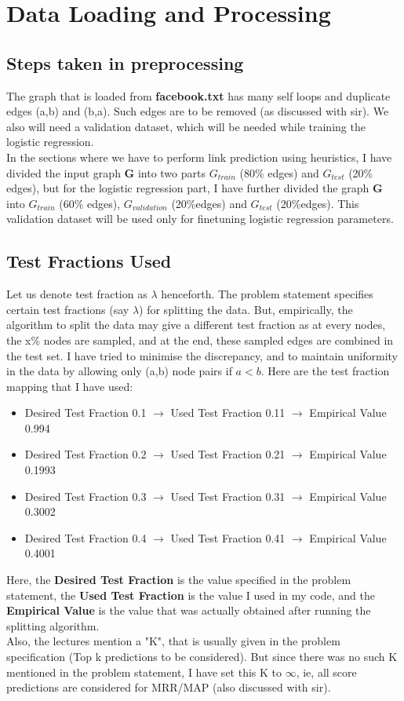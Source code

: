 \documentclass[12pt, a4paper]{article}
\begin{document}
\tableofcontents
\newpage

\section{Data Loading and Processing}
\subsection*{Steps taken in preprocessing}
\quad The graph that is loaded from \textbf{facebook.txt} has many self loops and duplicate edges (a,b) and (b,a). Such edges are to be removed (as discussed with sir). We also will need a validation dataset, which will be needed while training the logistic regression. \\
\null\quad In the sections where we have to perform link prediction using heuristics, I have divided the input graph \textbf{G} into two parts $G_{train}$ (80\% edges) and $G_{test}$ (20\% edges), but for the logistic regression part, I have further divided the graph \textbf{G} into $G_{train}$ (60\% edges), $G_{validation}$ (20\%edges) and $G_{test}$ (20\%edges). This validation dataset will be used only for finetuning logistic regression parameters.
\subsection*{Test Fractions Used}
Let us denote test fraction as $\lambda$ henceforth.
\quad The problem statement specifies certain test fractions (say $\lambda$) for splitting the data. But, empirically, the algorithm to split the data may give a different test fraction as at every nodes, the x\% nodes are sampled, and at the end,  these sampled edges are combined in the test set. I have tried to minimise the discrepancy, and to maintain uniformity in the data by allowing only (a,b) node pairs if $a < b$. Here are the test fraction mapping that I have used:
\begin{itemize}
\item Desired Test Fraction 0.1 $\rightarrow$ Used Test Fraction 0.11 $\rightarrow$ Empirical Value 0.994
\item Desired Test Fraction 0.2 $\rightarrow$ Used Test Fraction 0.21 $\rightarrow$ Empirical Value 0.1993
\item Desired Test Fraction 0.3 $\rightarrow$ Used Test Fraction 0.31 $\rightarrow$ Empirical Value 0.3002
\item Desired Test Fraction 0.4 $\rightarrow$ Used Test Fraction 0.41 $\rightarrow$ Empirical Value 0.4001
\end{itemize}
Here, the \textbf{Desired Test Fraction }is the value specified in the problem statement, the \textbf{Used Test Fraction} is the value I used in my code, and the \textbf{Empirical Value} is the value that was actually obtained after running the splitting algorithm.\\
\null\quad Also, the lectures mention a "K", that is usually given in the problem specification (Top k predictions to be considered). But since there was no such K mentioned in the problem statement, I have set this K to $\infty$, ie, all score predictions are considered for MRR/MAP (also discussed with sir).
\newpage
\end{document}
